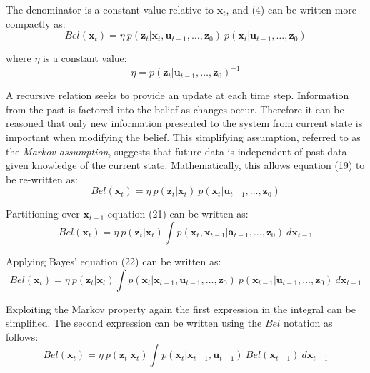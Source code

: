 \documentclass[a4paper]{article}
\begin{document}
The denominator is a constant value relative to $\mathbf{x}_t$, and (4) can be written more compactly as:
\begin{equation}
Bel(\mathbf{x}_t) = \eta \ p(\mathbf{z}_t | \mathbf{x}_t,\mathbf{u}_{t-1},\ldots,\mathbf{z}_0) \ p(\mathbf{x}_t | \mathbf{u}_{t-1},\ldots,\mathbf{z}_0)
\end{equation}

where $\eta$ is a constant value:
\begin{equation}
\eta = p(\mathbf{z}_t | \mathbf{u}_{t-1},\ldots,\mathbf{z}_0)^{-1}
\end{equation}

A recursive relation seeks to provide an update at each time step. Information from the past is factored into the belief as changes occur. Therefore it can be reasoned that only new information presented to the system from current state is important when modifying the belief. This simplifying assumption, referred to as the \textit{Markov assumption}, suggests that future data is independent of past data given knowledge of the current state. Mathematically, this allows equation (19) to be re-written as:
\begin{equation}
Bel(\mathbf{x}_t) = \eta \ p(\mathbf{z}_t | \mathbf{x}_t) \ p(\mathbf{x}_t | \mathbf{u}_{t-1},\ldots,\mathbf{z}_0)
\end{equation} 

Partitioning over $\mathbf{x}_{t-1}$ equation (21) can be written as:
\begin{equation}
Bel(\mathbf{x}_t) = \eta \ p(\mathbf{z}_t | \mathbf{x}_t) \int p(\mathbf{x}_t, \mathbf{x}_{t-1} | \mathbf{a}_{t-1},\ldots,\mathbf{z}_0) \ d\mathbf{x}_{t-1}
\end{equation}

Applying Bayes' equation (22) can be written as:
\begin{equation}
Bel(\mathbf{x}_t) = \eta \ p(\mathbf{z}_t | \mathbf{x}_t) \int p(\mathbf{x}_{t} | \mathbf{x}_{t-1},\mathbf{u}_{t-1},\ldots,\mathbf{z}_0) \ p(\mathbf{x}_{t-1} | \mathbf{u}_{t-1},\ldots,\mathbf{z}_0) \ d\mathbf{x}_{t-1}
\end{equation}

Exploiting the Markov property again the first expression in the integral can be simplified. The second expression can be written using the $Bel$ notation as follows:
\begin{equation}
Bel(\mathbf{x}_t) = \eta \ p(\mathbf{z}_t | \mathbf{x}_t) \int p(\mathbf{x}_{t} | \mathbf{x}_{t-1},\mathbf{u}_{t-1}) \ Bel(\mathbf{x}_{t-1}) \ d\mathbf{x}_{t-1}
\end{equation}
\end{document}
